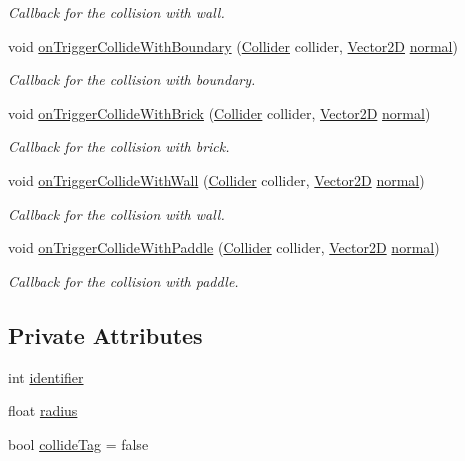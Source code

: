 \begin{DoxyCompactItemize}
\begin{DoxyCompactList}\small\item\em Callback for the collision with wall. \end{DoxyCompactList}\item 
void \mbox{\hyperlink{class_ball_a4a9237d30bf79a0bef3068e666ffd440}{on\+Trigger\+Collide\+With\+Boundary}} (\mbox{\hyperlink{class_collider}{Collider}} collider, \mbox{\hyperlink{struct_vector2_d}{Vector2D}} \mbox{\hyperlink{class_collider_a9326e2676880c40f35832ed2c6d6b073}{normal}})
\begin{DoxyCompactList}\small\item\em Callback for the collision with boundary. \end{DoxyCompactList}\item 
void \mbox{\hyperlink{class_ball_a5ca1595a6a1d80a8c5c015e013e0aaa2}{on\+Trigger\+Collide\+With\+Brick}} (\mbox{\hyperlink{class_collider}{Collider}} collider, \mbox{\hyperlink{struct_vector2_d}{Vector2D}} \mbox{\hyperlink{class_collider_a9326e2676880c40f35832ed2c6d6b073}{normal}})
\begin{DoxyCompactList}\small\item\em Callback for the collision with brick. \end{DoxyCompactList}\item 
void \mbox{\hyperlink{class_ball_a0afd6ef35ad091316c5002f755c54d75}{on\+Trigger\+Collide\+With\+Wall}} (\mbox{\hyperlink{class_collider}{Collider}} collider, \mbox{\hyperlink{struct_vector2_d}{Vector2D}} \mbox{\hyperlink{class_collider_a9326e2676880c40f35832ed2c6d6b073}{normal}})
\begin{DoxyCompactList}\small\item\em Callback for the collision with wall. \end{DoxyCompactList}\item 
void \mbox{\hyperlink{class_ball_a9755b22d4718fc8d46850dce8b681749}{on\+Trigger\+Collide\+With\+Paddle}} (\mbox{\hyperlink{class_collider}{Collider}} collider, \mbox{\hyperlink{struct_vector2_d}{Vector2D}} \mbox{\hyperlink{class_collider_a9326e2676880c40f35832ed2c6d6b073}{normal}})
\begin{DoxyCompactList}\small\item\em Callback for the collision with paddle. \end{DoxyCompactList}\end{DoxyCompactItemize}
\subsection*{Private Attributes}
\begin{DoxyCompactItemize}
\item 
int \mbox{\hyperlink{class_ball_a0cc36bfd335b414464d66b2f07935943}{identifier}}
\item 
float \mbox{\hyperlink{class_ball_a86bfb032007c736e06c2295a8070d620}{radius}}
\item 
bool \mbox{\hyperlink{class_ball_ab93ce7f0f587c81b5a1cfe437dd18f46}{collide\+Tag}} = false
\end{DoxyCompactItemize}
